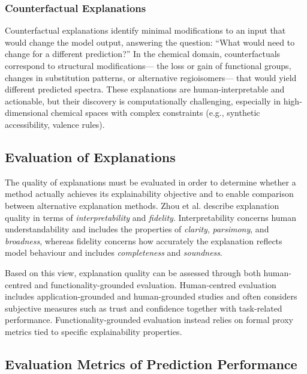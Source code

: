 \subsubsection{Counterfactual Explanations}

Counterfactual explanations identify minimal modifications to an input that would change the model output, answering the question: ``What would need to change for a different prediction?'' \cite[p.~4]{Guidotti2018}
In the chemical domain, counterfactuals correspond to structural modifications--- the loss or gain of functional groups, changes in substitution patterns, or alternative regioisomers--- that would yield different predicted spectra. \cite[pp.~2--3]{Wellawatte2022}
These explanations are human-interpretable and actionable, but their discovery is computationally challenging, especially in high-dimensional chemical spaces with complex constraints (e.g., synthetic accessibility, valence rules).

\subsection{Evaluation of Explanations}

The quality of explanations must be evaluated in order to determine whether a method actually achieves its explainability objective and to enable comparison between alternative explanation methods. \cite[p.~1]{Zhou2021} 
Zhou et al. describe explanation quality in terms of \emph{interpretability} and \emph{fidelity}. 
Interpretability concerns human understandability and includes the properties of \emph{clarity}, \emph{parsimony}, and \emph{broadness}, whereas fidelity concerns how accurately the explanation reflects model behaviour and includes \emph{completeness} and \emph{soundness}. \cite[p.~3]{Zhou2021}

Based on this view, explanation quality can be assessed through both human-centred and functionality-grounded evaluation. Human-centred evaluation includes application-grounded and human-grounded studies and often considers subjective measures such as trust and confidence together with task-related performance.
Functionality-grounded evaluation instead relies on formal proxy metrics tied to specific explainability properties. \cite[p.~8]{Zhou2021} \cite[p.~10]{Zhou2021}

\subsection{Evaluation Metrics of Prediction Performance}

